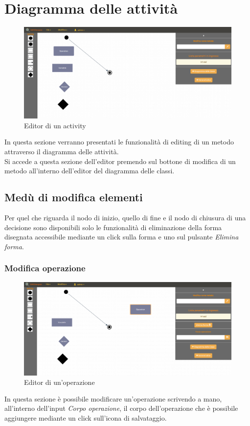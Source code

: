 \section{Diagramma delle attività}
	\begin{figure}[h!]
		\centering
			\includegraphics[scale=0.22]{res/img/activity1.png}
		\caption{Editor di un activity}
	\end{figure}
	In questa sezione verranno presentati le funzionalità di editing di un metodo attraverso il diagramma delle attività.\\
	Si accede a questa sezione dell'editor premendo sul bottone di modifica di un metodo all'interno dell'editor del diagramma delle classi.\\

	\subsection{Medù di modifica elementi}
	 Per quel che riguarda il nodo di inizio, quello di fine e il nodo di chiusura di una decisione sono disponibili solo le funzionalità di eliminazione della forma disegnata accessibile mediante un click sulla forma
	 e uno sul pulsante \emph{Elimina forma}.\\
	 \subsubsection{Modifica operazione}
		 \begin{figure}[h!]
	 		\centering
	 			\includegraphics[scale=0.22]{res/img/activity2.png}
	 		\caption{Editor di un'operazione}
	 	\end{figure}
		In questa sezione è possibile modificare un'operazione scrivendo a mano, all'interno dell'input \emph{Corpo operazione}, il corpo dell'operazione che è possibile
		aggiungere mediante un click sull'icona di salvataggio.
